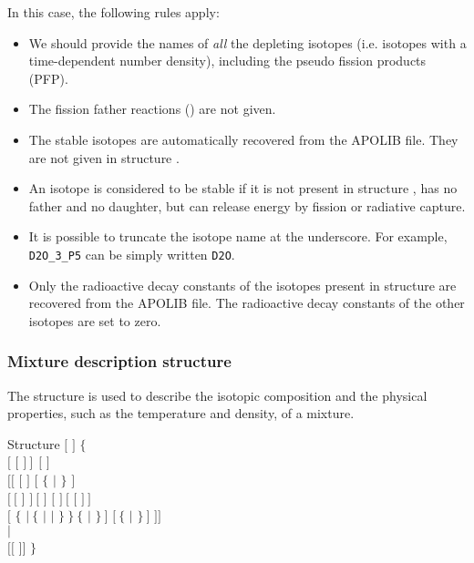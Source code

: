 \vskip 0.15cm

In this case, the following rules apply:
\begin{itemize}
\item We should provide the names  of {\sl all} the depleting
isotopes (i.e. isotopes with a time-dependent number density), including the
pseudo fission products (PFP).
\item The fission father reactions () are not given.
\item The stable isotopes are automatically recovered from the
APOLIB file. They are not given in structure .
\item An isotope is considered to be stable if it is not present in
structure , has no father and no daughter,
but can release energy by fission or radiative capture.
\item It is possible to truncate the isotope name  at the
underscore. For example, {\tt D2O\_3\_P5} can be simply written {\tt D2O}.
\item Only the radioactive decay constants of the isotopes present in
structure  are recovered from the APOLIB file. The
radioactive decay constants of the other isotopes are set to zero.
\end{itemize}

\subsubsection{Mixture description structure}\label{sect:descmix}

The structure  is used to describe the isotopic composition and
the physical properties, such as the temperature and density, of a mixture.

\begin{DataStructure}{Structure }
 $[$  $]$ $\{$ \\
\hskip 1.0cm $[$ $[$  $]~]~~[$  $]$\\
\hskip 2.0cm $[[$  $[$  \moc{=} $]$   $[$ $\{$  
    $|$  $\}$ $]$\\
\hskip 2.0cm $[~[$  $]$  $]~[$   $]$ $[$  
 $]~[$    $[$   $]~]$ \\
\hskip 2.0cm $[$  $\{$  $|~\{$  $|$  $|$ $\}~\}~\{$
 $|$  $\}~]$ $[~\{$  $|$  $\}~]$ $]]$ \\
\hskip 1.0cm $|$ \\
\hskip 1.0cm  $[[$   $]]$ $\}$
\end{DataStructure}

